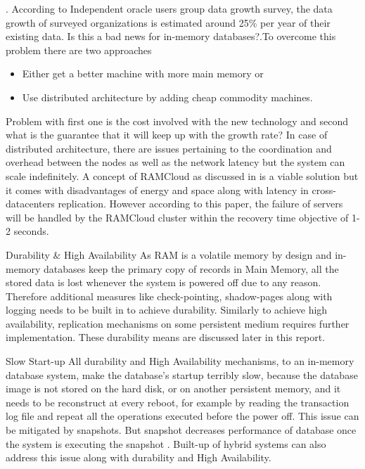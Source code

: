 \documentclass[10pt]{article} %
\begin{document}
\begin{description}
\item[Scalability]. 
According to Independent oracle users group data growth survey\cite{oracleDataGrowth}, the data growth of surveyed organizations is estimated around 25\% per year of their existing data. Is this a bad news for in-memory databases?.To overcome this problem there are two approaches
\begin{itemize}
\item Either get a better machine with more main memory or
\item Use distributed architecture by adding cheap commodity machines. 
\end{itemize}
Problem with first one is the cost involved with the new technology and second what is the guarantee that it will keep up with the growth rate? In case of distributed architecture, there are issues pertaining to the coordination and overhead between the nodes as well as the network latency but the system can scale indefinitely. A concept of RAMCloud as discussed in \cite{ousterhout2010caseRamClouds} is a viable solution but it comes with disadvantages of energy and space along with latency in cross-datacenters replication. However according to this paper, the failure of servers will be handled by the RAMCloud cluster within the recovery time objective of 1-2 seconds. 


\item {Durability \& High Availability}
As RAM is a volatile memory by design and in-memory databases keep the primary copy of records in Main Memory, all the stored data is lost whenever the system is powered off due to any reason. Therefore additional measures like check-pointing, shadow-pages along with logging needs to be built in to achieve durability. Similarly to achieve high availability, replication mechanisms on some persistent medium requires further implementation. These durability means are discussed later in this report. 

\item {Slow Start-up}
All durability and High Availability mechanisms, to an in-memory database system, make the database's startup terribly slow, because the database image is not stored on the hard disk, or on another persistent memory, and it needs to be reconstruct at every reboot, for example by reading the transaction log file and repeat all the operations executed before the power off. This issue can be mitigated by snapshots. But snapshot decreases performance of database once the system is executing the snapshot \cite{Mcobject-Myths}. Built-up of hybrid systems can also address this issue along with durability and High Availability. 


\end{description}
\end{document}
